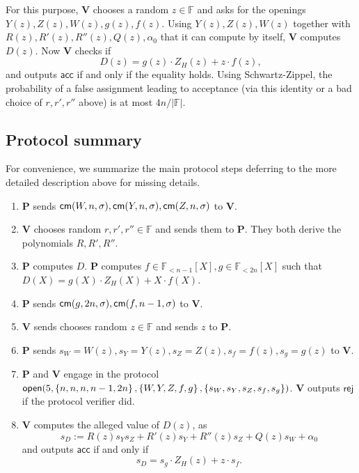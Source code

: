 \documentclass[11pt]{article}
\numberwithin{figure}{section} %
\newcommand{\set}[1]{\ensuremath{\left\{#1\right\}}\xspace}
\newcommand{\F}{\ensuremath{\mathbb F}\xspace}
\newcommand{\rej}{\ensuremath{\mathsf{rej}}\xspace}
\newcommand{\acc}{\ensuremath{\mathsf{acc}}\xspace}
\newcommand{\defeq}{:=}
\newcommand{\prv}{\ensuremath{\mathsf{\mathbf{P}}}\xspace}
\newcommand{\ver}{\ensuremath{\mathsf{\mathbf{V}}}\xspace}
\newcommand{\polysofdeg}[1]{\ensuremath{\F_{< #1}[X]}\xspace}
\begin{document}
For this purpose, \ver chooses a random $z\in \F$ and asks for the openings $Y (z), Z(z), W(z), g(z), f(z)$. Using  $Y(z),Z(z),W(z)$ together with $R(z), R'(z), R''(z), Q(z), \alpha_0$ that it can compute by itself, \ver computes $D(z)$. Now \ver checks if
\[D(z) = g(z) \cdot Z_H(z) + z \cdot f(z),\]
and outputs \acc if and only if the equality holds.
Using Schwartz-Zippel, the probability of a false assignment leading to acceptance (via this identity or a bad choice of $r, r', r''$ above) is at most $4n/|\F|$.

\subsection{Protocol summary}
For convenience, we summarize the main protocol steps deferring to the more detailed description above for missing details.

\begin{enumerate}
 \item \prv sends $\mathsf{cm}(W,n,\sigma),\mathsf{cm}(Y,n,\sigma),\mathsf{cm}(Z,n,\sigma)$ to \ver.
 \item\label{step:ver1} \ver chooses random $r,r',r''\in \F$ and sends them to \prv. They both derive the polynomials $R,R',R''$.
 \item \prv computes $D$. \prv computes $f\in \polysofdeg{n-1},g\in \polysofdeg{2n}$ such that $D(X)=g(X)\cdot Z_H(X) + X\cdot f(X)$.
 \item \prv sends $\mathsf{cm}(g,2n,\sigma), \mathsf{cm}(f,n-1,\sigma)$ to \ver.
 \item\label{step:ver2} \ver sends chooses random $z\in \F$ and sends $z$ to \prv.
 \item \prv sends $s_W = W(z),s_Y= Y(z),s_Z = Z(z),s_f = f(z),s_g = g(z)$ to \ver.
 \item  \prv and \ver engage in the protocol $\open(5,\set{n,n,n,n-1,2n},\set{W,Y,Z,f,g},\set{s_W,s_Y,s_Z,s_f,s_g})$. \ver outputs \rej if the protocol verifier did.
 \item\label{step:ver3} \ver computes the alleged value of $D(z)$, as 
 \[s_D\defeq R(z)s_Y s_Z + R'(z)s_Y+ R''(z)s_Z+ Q(z)s_W + \alpha_0  \]
and outputs \acc if and only if \[s_D = s_g \cdot Z_H(z) + z \cdot s_f.\]
 
\end{enumerate}

% 
\end{document}
